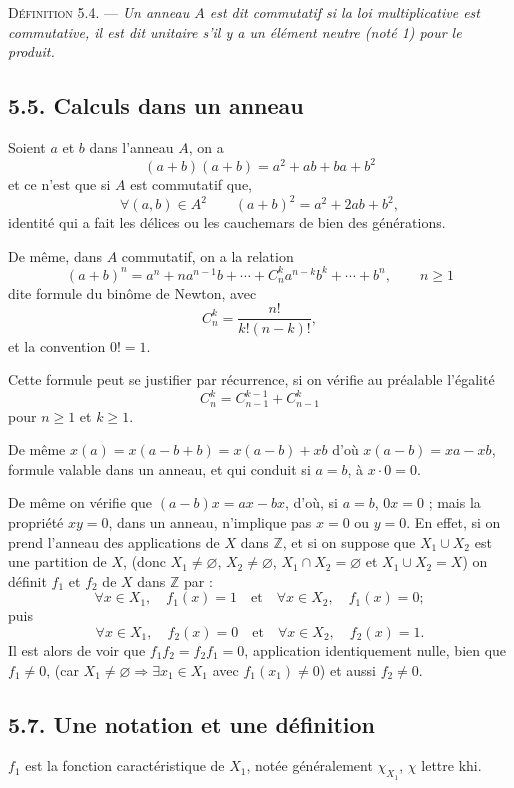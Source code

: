 \medskip\noindent\textsc{Définition 5.4.} --- \emph{Un anneau $A$ est dit commutatif si la loi multiplicative est commutative, il est dit unitaire s'il y a un élément neutre (noté 1) pour le produit.}

\subsection*{5.5. Calculs dans un anneau}

Soient $a$ et $b$ dans l'anneau $A$, on a
\[
(a+b)(a+b)=a^2+ab+ba+b^2
\]
et ce n'est que si $A$ est commutatif que,
\[
\forall(a,b)\in A^2\qquad (a+b)^2=a^2+2ab+b^2,
\]
identité qui a fait les délices ou les cauchemars de bien des générations.

De même, dans $A$ commutatif, on a la relation
\[
\tag{5.6}(a+b)^n=a^n+na^{n-1}b+\cdots+C_n^k a^{n-k}b^k+\cdots+b^n,\qquad n\ge1
\]
dite formule du binôme de Newton, avec
\[
C_n^k=\frac{n!}{k!(n-k)!},
\]
et la convention $0!=1$.

Cette formule peut se justifier par récurrence, si on vérifie au préalable l'égalité
\[
C_n^k=C_{n-1}^{k-1}+C_{n-1}^k
\]
pour $n\ge1$ et $k\ge1$.

De même $x(a)=x(a-b+b)=x(a-b)+xb$ d'où $x(a-b)=xa-xb$, formule valable dans un anneau, et qui conduit si $a=b$, à $x\cdot0=0$.

De même on vérifie que $(a-b)x=ax-bx$, d'où, si $a=b$, $0x=0$ ; mais la propriété $xy=0$, dans un anneau, n'implique pas $x=0$ ou $y=0$. En effet, si on prend l'anneau des applications de $X$ dans $\mathbb Z$, et si on suppose que $X_1\cup X_2$ est une partition de $X$, (donc $X_1\ne\varnothing$, $X_2\ne\varnothing$, $X_1\cap X_2=\varnothing$ et $X_1\cup X_2=X$) on définit $f_1$ et $f_2$ de $X$ dans $\mathbb Z$ par :
\[
\forall x\in X_1,\quad f_1(x)=1\quad\text{et}\quad \forall x\in X_2,\quad f_1(x)=0;
\]
puis
\[
\forall x\in X_1,\quad f_2(x)=0\quad\text{et}\quad \forall x\in X_2,\quad f_2(x)=1.
\]
Il est alors  de voir que $f_1f_2=f_2f_1=0$, application identiquement nulle, bien que $f_1\ne0$, (car $X_1\ne\varnothing\Rightarrow\exists x_1\in X_1$ avec $f_1(x_1)\ne0$) et aussi $f_2\ne0$.

\subsection*{5.7. Une notation et une définition}
$f_1$ est la fonction caractéristique de $X_1$, notée généralement $\chi_{X_1}$, $\chi$ lettre khi.

